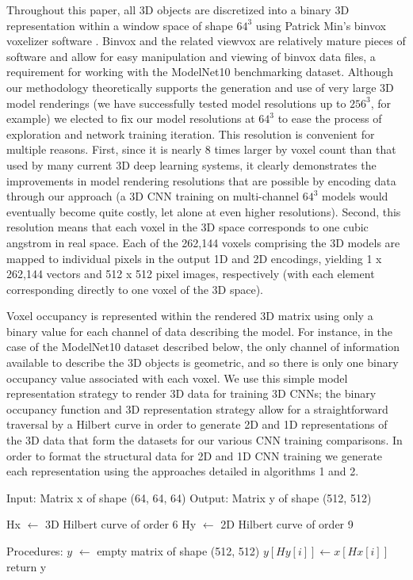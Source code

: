 \documentclass{article}
\begin{document}
Throughout this paper, all 3D objects are discretized into a binary 3D representation within a window space of shape $64^3$ using Patrick Min's binvox voxelizer software \cite{patrickmin}. Binvox and the related viewvox are relatively mature pieces of software and allow for easy manipulation and viewing of binvox data files, a requirement for working with the ModelNet10 benchmarking dataset. Although our methodology theoretically supports the generation and use of very large 3D model renderings (we have successfully tested model resolutions up to $256^3$, for example) we elected to fix our model resolutions at $64^3$ to ease the process of exploration and network training iteration. This resolution is convenient for multiple reasons. First, since it is nearly 8 times larger by voxel count than that used by many current 3D deep learning systems, it clearly demonstrates the improvements in model rendering resolutions that are possible by encoding data through our approach (a 3D CNN training on multi-channel $64^3$ models would eventually become quite costly, let alone at even higher resolutions). Second, this resolution means that each voxel in the 3D space corresponds to one cubic angstrom in real space. Each of the 262,144 voxels comprising the 3D models are mapped to individual pixels in the output 1D and 2D encodings, yielding 1 x 262,144 vectors and 512 x 512 pixel images, respectively (with each element corresponding directly to one voxel of the 3D space). 

Voxel occupancy is represented within the rendered 3D matrix using only a binary value for each channel of data describing the model. For instance, in the case of the ModelNet10 dataset described below, the only channel of information available to describe the 3D objects is geometric, and so there is only one binary occupancy value associated with each voxel. We use this simple model representation strategy to render 3D data for training 3D CNNs; the binary occupancy function and 3D representation strategy allow for a straightforward traversal by a Hilbert curve in order to generate 2D and 1D representations of the 3D data that form the datasets for our various CNN training comparisons. In order to format the structural data for 2D and 1D CNN training we generate each representation using the approaches detailed in algorithms 1 and 2.

\begin{algorithm}[h!]
  \caption{3D to 2D Hilbert Curve Mapping}
  \begin{algorithmic}
    \STATE Input: Matrix x of shape (64, 64, 64)
    \STATE Output: Matrix y of shape (512, 512)

    \STATE Hx $\gets$ 3D Hilbert curve of order 6
    \STATE Hy $\gets$ 2D Hilbert curve of order 9

    \STATE Procedures:
    \STATE $y$ $\gets$ empty matrix of shape (512, 512)
        \STATE $y[Hy[ i ]] \gets x[Hx[ i ]]$
      \ENDFOR
    \STATE return y  
  \end{algorithmic}
\end{algorithm}
\end{document}
